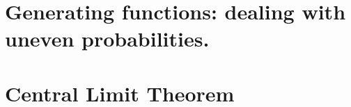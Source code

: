 \documentclass[letterpaper,12pt]{report}
\begin{document}









\section{Generating functions: dealing with uneven probabilities.}\label{sec:generating-functions} %



\section{Central Limit Theorem} %






\end{document}
